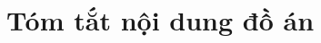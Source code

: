 \documentclass{article}
\begin{document}
% 

% 


% 
 

% 
 
\section{Tóm tắt nội dung đồ án}












\end{document}
